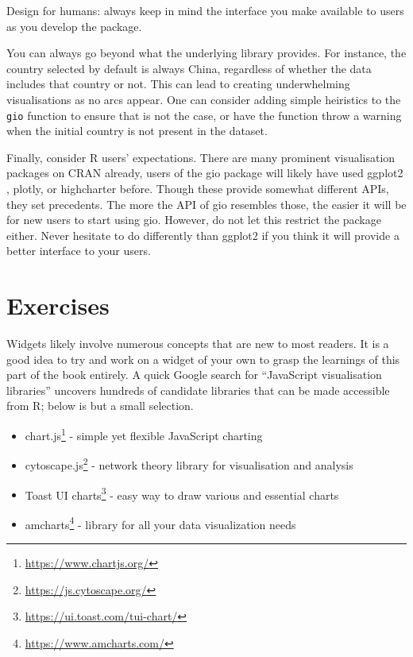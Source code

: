 \documentclass[10pt,]{krantz}
\makeatletter
\providecommand{\tightlist}{%
  \setlength{\itemsep}{0pt}\setlength{\parskip}{0pt}}
\renewcommand{\href}[2]{#2\footnote{\url{#1}}}
\newenvironment{kframe}{%
\medskip{}
\setlength{\fboxsep}{.8em}
 \def\at@end@of@kframe{}%
 \ifinner\ifhmode%
  \def\at@end@of@kframe{\end{minipage}}%
  \begin{minipage}{\columnwidth}%
 \fi\fi%
 \def\FrameCommand##1{\hskip\@totalleftmargin \hskip-\fboxsep
 \colorbox{shadecolor}{##1}\hskip-\fboxsep
     \hskip-\linewidth \hskip-\@totalleftmargin \hskip\columnwidth}%
 \MakeFramed {\advance\hsize-\width
   \@totalleftmargin\z@ \linewidth\hsize
   \@setminipage}}%
 {\par\unskip\endMakeFramed%
 \at@end@of@kframe}
\newenvironment{rmdblock}[1]
  {
  \begin{itemize}
  \renewcommand{\labelitemi}{
    \raisebox{-.7\height}[0pt][0pt]{
      {\setkeys{Gin}{width=3em,keepaspectratio}\texttt{[image: images/\#1]}}
    }
  }
  \setlength{\fboxsep}{1em}
  \begin{kframe}
  \item
  }
  {
  \end{kframe}
  \end{itemize}
  }
\newenvironment{rmdnote}
  {\begin{rmdblock}{note}}
  {\end{rmdblock}}
\makeatother
\begin{document}
\begin{rmdnote}
Design for humans: always keep in mind the interface you make available
to users as you develop the package.
\end{rmdnote}

You can always go beyond what the underlying library provides. For instance, the country selected by default is always China, regardless of whether the data includes that country or not. This can lead to creating underwhelming visualisations as no arcs appear. One can consider adding simple heiristics to the \texttt{gio} function to ensure that is not the case, or have the function throw a warning when the initial country is not present in the dataset.

Finally, consider R users' expectations. There are many prominent visualisation packages on CRAN already, users of the gio package will likely have used ggplot2 \citep{R-ggplot2}, plotly, or highcharter before. Though these provide somewhat different APIs, they set precedents. The more the API of gio resembles those, the easier it will be for new users to start using gio. However, do not let this restrict the package either. Never hesitate to do differently than ggplot2 if you think it will provide a better interface to your users.

\hypertarget{widgets-final-exercises}{%
\section{Exercises}\label{widgets-final-exercises}}

Widgets likely involve numerous concepts that are new to most readers. It is a good idea to try and work on a widget of your own to grasp the learnings of this part of the book entirely. A quick Google search for ``JavaScript visualisation libraries'' uncovers hundreds of candidate libraries that can be made accessible from R; below is but a small selection.

\begin{itemize}
\tightlist
\item
  \href{https://www.chartjs.org/}{chart.js} - simple yet flexible JavaScript charting
\item
  \href{https://js.cytoscape.org/}{cytoscape.js} - network theory library for visualisation and analysis
\item
  \href{https://ui.toast.com/tui-chart/}{Toast UI charts} - easy way to draw various and essential charts
\item
  \href{https://www.amcharts.com/}{amcharts} - library for all your data visualization needs
\end{itemize}
\end{document}
